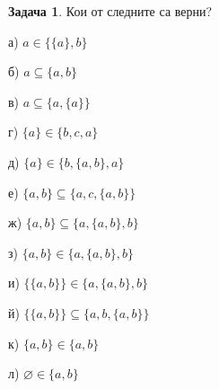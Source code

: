 \documentclass[10pt, a4paper]{article}
\theoremstyle{definition}
\newtheorem{problem}{Задача}
\theoremstyle{remark}
\begin{document}
\hfill
\begin{problem}
    Кои от следните са верни?
    
    \begin{minipage}[t]{0.25\textwidth}
        а) $a\in\{\{a\},b\}$
    \end{minipage}
    \begin{minipage}[t]{0.25\textwidth}
        б) $a\subseteq\{a,b\}$
    \end{minipage}
    \begin{minipage}[t]{0.25\textwidth}
        в) $a\subseteq\{a,\{a\}\}$
    \end{minipage}
    \begin{minipage}[t]{0.25\textwidth}
        г) $\{a\}\in\{b,c,a\}$
    \end{minipage}
    \vspace{0.1cm}
    
    \begin{minipage}[t]{0.25\textwidth}
        д) $\{a\}\in\{b,\{a,b\},a\}$
    \end{minipage}
    \begin{minipage}[t]{0.25\textwidth}
        е) $\{a,b\}\subseteq\{a,c,\{a,b\}\}$
    \end{minipage}
    \begin{minipage}[t]{0.25\textwidth}
        ж) $\{a,b\}\subseteq\{a,\{a,b\},b\}$
    \end{minipage}
    \begin{minipage}[t]{0.25\textwidth}
        з) $\{a,b\}\in\{a,\{a,b\},b\}$
    \end{minipage}
    \vspace{0.1cm}
    
    \begin{minipage}[t]{0.25\textwidth}
        и) $\{\{a,b\}\}\in\{a,\{a,b\},b\}$
    \end{minipage}
    \begin{minipage}[t]{0.25\textwidth}
        й) $\{\{a,b\}\}\subseteq\{a,b,\{a,b\}\}$
    \end{minipage}
    \begin{minipage}[t]{0.25\textwidth}
        к) $\{a,b\}\in\{a,b\}$
    \end{minipage}
    \begin{minipage}[t]{0.25\textwidth}
        л) $\varnothing\in\{a,b\}$
    \end{minipage}
    \vspace{0.1cm}
    

\end{problem}
\end{document}
